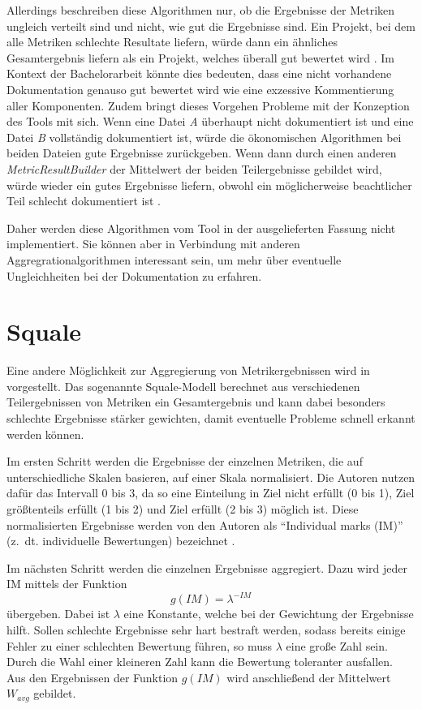  Allerdings beschreiben diese Algorithmen nur, ob die Ergebnisse der Metriken ungleich verteilt sind und nicht, wie gut die Ergebnisse sind. Ein Projekt, bei dem alle Metriken schlechte Resultate liefern, würde dann ein ähnliches Gesamtergebnis liefern als ein Projekt, welches überall gut bewertet wird \cite[S. 1121]{Softwarequalitymetricsaggregationinindustry}.  Im Kontext der Bachelorarbeit könnte dies bedeuten, dass eine nicht vorhandene Dokumentation genauso gut bewertet wird wie eine exzessive Kommentierung aller Komponenten. Zudem bringt dieses Vorgehen Probleme mit der Konzeption des Tools mit sich. Wenn eine Datei \textit{A} überhaupt nicht dokumentiert ist und eine Datei \textit{B} vollständig dokumentiert ist, würde die ökonomischen Algorithmen bei beiden Dateien gute Ergebnisse zurückgeben. Wenn dann durch einen anderen \textit{MetricResultBuilder} der Mittelwert der beiden Teilergebnisse gebildet wird, würde wieder ein gutes Ergebnisse liefern, obwohl ein möglicherweise beachtlicher Teil schlecht dokumentiert ist .
 
 Daher werden diese Algorithmen vom Tool in der ausgelieferten Fassung nicht implementiert. Sie können aber in Verbindung mit anderen Aggregrationalgorithmen interessant sein, um mehr über eventuelle Ungleichheiten bei der Dokumentation zu erfahren.
 
 \section{Squale}
 Eine andere Möglichkeit zur Aggregierung von Metrikergebnissen wird in \cite[S. 1124]{Softwarequalitymetricsaggregationinindustry} vorgestellt. Das sogenannte Squale-Modell berechnet aus verschiedenen Teilergebnissen von Metriken ein Gesamtergebnis und kann dabei besonders schlechte Ergebnisse stärker gewichten, damit eventuelle Probleme schnell erkannt werden können. 
 
 Im ersten Schritt werden die Ergebnisse der einzelnen Metriken, die auf unterschiedliche Skalen basieren, auf einer Skala normalisiert. Die Autoren nutzen dafür das Intervall 0 bis 3, da so eine Einteilung in Ziel nicht erfüllt (0 bis 1), Ziel größtenteils erfüllt (1 bis 2) und Ziel erfüllt (2 bis 3) möglich ist. Diese normalisierten Ergebnisse werden von den Autoren als \enquote{Individual marks (IM)} (z.~dt. individuelle Bewertungen) bezeichnet \cite[S. 142]{AnEmpiricalModelforContinuousandWeightedMetricAggregation}. 
 
 Im nächsten Schritt werden die einzelnen Ergebnisse aggregiert. Dazu wird jeder IM mittels der Funktion
 \begin{equation}
     g(IM)=\lambda^{-IM}
 \end{equation} übergeben. Dabei ist $\lambda$ eine Konstante, welche bei der Gewichtung der Ergebnisse hilft. Sollen schlechte Ergebnisse sehr hart bestraft werden, sodass bereits einige Fehler zu einer schlechten Bewertung führen, so muss $\lambda$ eine große Zahl sein. Durch die Wahl einer kleineren Zahl kann die Bewertung toleranter ausfallen. Aus den Ergebnissen der Funktion $g(IM)$ wird anschließend der Mittelwert $W_{avg}$ gebildet.
 
